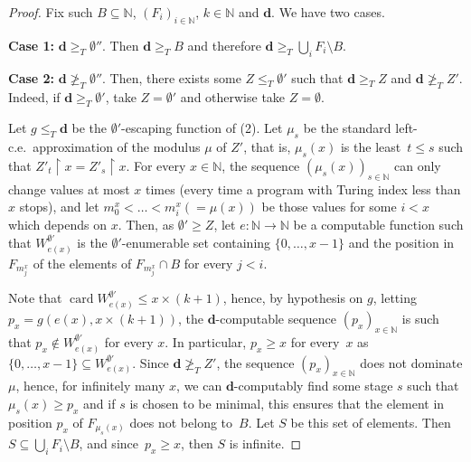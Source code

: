 \documentclass{article}
\numberwithin{theorem}{section}
\newcommand{\dbf}{\mathbf{d}}
\newcommand{\uh}{\upharpoonright}
\newcommand{\NN}[0]{\mathbb{N}}
\newcommand{\card}{\operatorname{card}}
\begin{document}
\begin{proof}
Fix such $B \subseteq \NN$, $(F_i)_{i \in \NN}$, $k \in \NN$ and $\dbf$. We have two cases.
\smallskip

\textbf{Case 1:} $\dbf \geq_T \emptyset''$. Then $\dbf \geq_T B$ and therefore $\dbf \geq_T \bigcup_i F_i \setminus B$.

\smallskip

\textbf{Case 2:} $\dbf \not \geq_T \emptyset''$. Then, there exists some $Z \leq_T \emptyset'$ such that $\dbf \geq_T Z$ and $\dbf \not \geq_T Z'$. Indeed, if $\dbf \geq_T \emptyset'$, take $Z = \emptyset'$ and otherwise take $Z = \emptyset$.

Let $g \leq_T \dbf$ be the $\emptyset'$-escaping function of (2). %
Let $\mu_s$ be the standard left-c.e.\ approximation of the modulus $\mu$ of $Z'$, that is, $\mu_s(x)$ is the least~$t \leq s$ such that $Z'_t \uh x = Z'_s \uh x$. For every $x \in \NN$, the sequence $(\mu_s(x))_{s \in \NN}$ can only change values at most $x$ times (every time a program with Turing index less than $x$ stops), and let $m_0^x < \dots < m_i^x (= \mu(x))$ be those values for some $i < x$ which depends on $x$. Then, as $\emptyset' \geq Z$, let $e : \NN \to \NN$ be a computable function such that $W^{\emptyset'}_{e(x)}$ is the $\emptyset'$-enumerable set containing $\{0, \dots, x-1\}$ and the position in $F_{m_j^x}$ of the elements of $F_{m_j^x} \cap B$ for every $j < i$. 

Note that $\card W^{\emptyset'}_{e(x)} \leq x \times (k+1)$, hence, by hypothesis on $g$, letting $p_x = g(e(x), x \times (k+1))$, the $\dbf$-computable sequence $(p_x)_{x \in \NN}$ is such that $p_x \notin W^{\emptyset'}_{e(x)}$ for every $x$. In particular, $p_x \geq x$ for every~$x$ as $\{0, \dots, x-1\} \subseteq W^{\emptyset'}_{e(x)}$. Since $\dbf \not \geq_T Z'$, the sequence $(p_x)_{x \in \NN}$ does not dominate $\mu$, hence, for infinitely many $x$, we can $\dbf$-computably find some stage $s$ such that $\mu_s(x) \geq p_x$ and if $s$ is chosen to be minimal, this ensures that the element in position $p_x$ of $F_{\mu_s(x)}$ does not belong to~$B$. Let $S$ be this set of elements. Then $S \subseteq \bigcup_i F_i \setminus B$, and since~$p_x \geq x$, then $S$ is infinite.


\end{proof}
\end{document}
